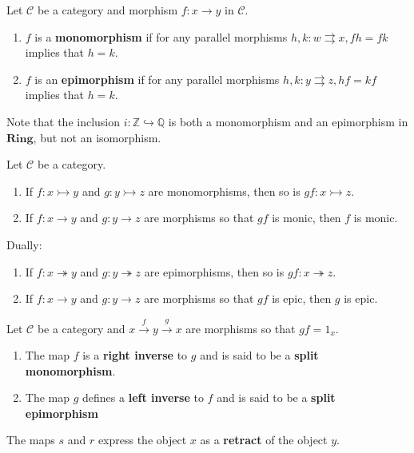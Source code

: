 \documentclass[12pt, oneside]{book}
\begin{document}
\begin{definition}
    Let $\mathcal{C}$ be a category and morphism $f: x \rightarrow y$ in $\mathcal{C}$.
    \begin{enumerate}
        \item
              $f$ is a \textbf{monomorphism} if for any parallel morphisms $h, k: w \rightrightarrows x, f h=f k$ implies that $h=k$.


        \item
              $f$ is an \textbf{epimorphism} if for any parallel morphisms $h, k: y \rightrightarrows z, h f=k f$ implies that $h=k$.


    \end{enumerate}
    \begin{remark}
        Note that the inclusion $i:\mathbb{Z} \hookrightarrow \mathbb{Q}$ is both a monomorphism and an epimorphism in $\mathbf{Ring}$, but not an isomorphism.
    \end{remark}
\end{definition}

\begin{proposition}
    Let $\mathcal{C}$ be a category.
    \begin{enumerate}
        \item
              If $f: x \rightarrowtail  y$ and $g: y \rightarrowtail z$ are monomorphisms, then so is $g f: x\rightarrowtail z$.
        \item
              If $f: x \rightarrow y$ and $g: y \rightarrow z$ are morphisms so that $g f$ is monic, then $f$ is monic.
    \end{enumerate}

    Dually:
    \begin{enumerate}
        \item
              If $f: x \twoheadrightarrow y$ and $g: y \twoheadrightarrow z$ are epimorphisms, then so is $g f: x \twoheadrightarrow  z$.
        \item
              If $f: x \rightarrow y$ and $g: y \rightarrow z$ are morphisms so that $g f$ is epic, then $g$ is epic.
    \end{enumerate}
\end{proposition}


\begin{definition}
    Let $\mathcal{C}$ be a category and $x \xrightarrow{f} y \xrightarrow{g} x$ are morphisms so that $g f=1_x$.

    \begin{enumerate}
        \item
              The map $f$ is a \textbf{right inverse} to $g$ and
              is said to be a \textbf{split monomorphism}.



        \item
              The map $g$ defines a \textbf{left inverse} to $f$ and is
              said to be a \textbf{split epimorphism}


    \end{enumerate}
    The maps $s$ and $r$ express the object $x$ as a \textbf{retract} of the object $y$.
\end{definition}
\end{document}
